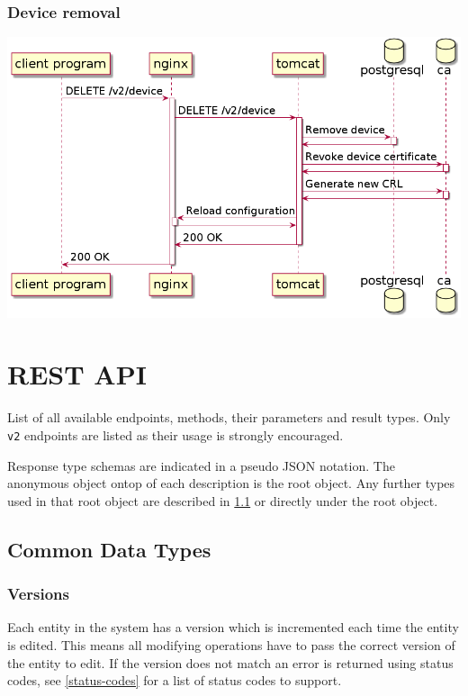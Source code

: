 \documentclass[12pt]{report}
\begin{document}
\subsection{Device removal}

\includegraphics[width=\linewidth]{diagrams/remove-device.png}

\chapter{REST API}

List of all available endpoints, methods, their parameters and result types. 
Only \texttt{v2} endpoints are listed as their usage is strongly encouraged.

Response type schemas are indicated in a pseudo JSON notation. The anonymous
object ontop of each description is the root object. Any further types used
in that root object are described in \ref{common-data-structures} or directly
under the root object.

\section{Common Data Types}\label{common-data-structures}

\subsection{Versions}

Each entity in the system has a version which is incremented each
time the entity is edited. This means all modifying operations have
to pass the correct version of the entity to edit. If the version does
not match an error is returned using status codes, see \ref{status-codes}
for a list of status codes to support.
\end{document}
